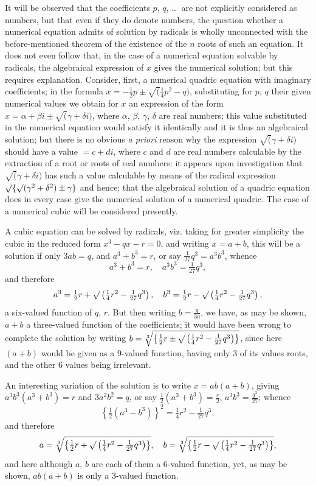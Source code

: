 \documentclass[11pt,a4paper]{book}
\begin{document}
It will be observed that the coefficients $p$, $q$, \ldots\ are not explicitly considered as numbers, but that even if they do denote numbers, the question whether a numerical equation admits of solution by radicals is wholly unconnected with the before-mentioned theorem of the existence of the $n$ roots of such an equation. It does not even follow that, in the case of a numerical equation solvable by radicals, the algebraical expression of $x$ gives the numerical solution; but this requires explanation. Consider, first, a numerical quadric equation with imaginary coefficients; in the formula $x = -\frac{1}{2}p \pm \surd(\frac{1}{4}p^2 - q)$, substituting for $p$, $q$ their given numerical values we obtain for $x$ an expression of the form $x = \alpha + \beta i \pm \surd(\gamma + \delta i)$, where $\alpha$, $\beta$, $\gamma$, $\delta$ are real numbers; this value substituted in the numerical equation would satisfy it identically and it is thus an algebraical solution; but there is no obvious \textit{a priori} reason why the expression $\surd(\gamma + \delta i)$ should have a value $= c + di$, where $c$ and $d$ are real numbers calculable by the extraction of a root or roots of real numbers: it appears upon investigation that $\surd(\gamma + \delta i)$ has such a value calculable by means of the radical expression $\surd\{\surd(\gamma^2 + \delta^2) \pm \gamma\}$ and hence; that the algebraical solution of a quadric equation does in every case give the numerical solution of a numerical quadric. The case of a numerical cubic will be considered presently.

A cubic equation can be solved by radicals, viz. taking for greater simplicity the cubic in the reduced form $x^3 - qx - r = 0$, and writing $x = a + b$, this will be a solution if only $3ab = q$, and $a^3 + b^3 = r$, or say $\frac{1}{27}q^3 = a^3b^3$, whence
\[
a^3 + b^3 = r, \quad a^3 b^3 = \tfrac{1}{27}q^3,
\]
and therefore
\[
a^3 = \tfrac{1}{2}r + \surd\left(\tfrac{1}{4}r^2 - \tfrac{1}{27}q^3\right), \quad b^3 = \tfrac{1}{2}r - \surd\left(\tfrac{1}{4}r^2 - \tfrac{1}{27}q^3\right),
\]
a six-valued function of $q$, $r$. But then writing $b = \frac{q}{3a}$, we have, as may be shown, $a + b$ a three-valued function of the coefficients; it would have been wrong to complete the solution by writing $b = \sqrt[3]{\left\{\frac{1}{2}r \pm \surd\left(\frac{1}{4}r^2 - \frac{1}{27}q^3\right)\right\}}$, since here $(a+b)$ would be given as a 9-valued function, having only 3 of its values roots, and the other 6 values being irrelevant.

An interesting variation of the solution is to write $x = ab(a+b)$, giving $a^3b^3(a^3+b^3) = r$ and $3a^2b^2 = q$, or say $\frac{1}{2}(a^3+b^3) = \frac{r}{2}$, $a^3b^3 = \frac{q^3}{27}$; whence
\[
\left\{\tfrac{1}{2}(a^3 - b^3)\right\}^2 = \tfrac{1}{4}r^2 - \tfrac{1}{27}q^3,
\]
and therefore
\[
a = \sqrt[3]{\left\{\tfrac{1}{2}r + \surd\left(\tfrac{1}{4}r^2 - \tfrac{1}{27}q^3\right)\right\}}, \quad b = \sqrt[3]{\left\{\tfrac{1}{2}r - \surd\left(\tfrac{1}{4}r^2 - \tfrac{1}{27}q^3\right)\right\}},
\]
and here although $a$, $b$ are each of them a 6-valued function, yet, as may be shown, $ab(a+b)$ is only a 3-valued function.
\end{document}
